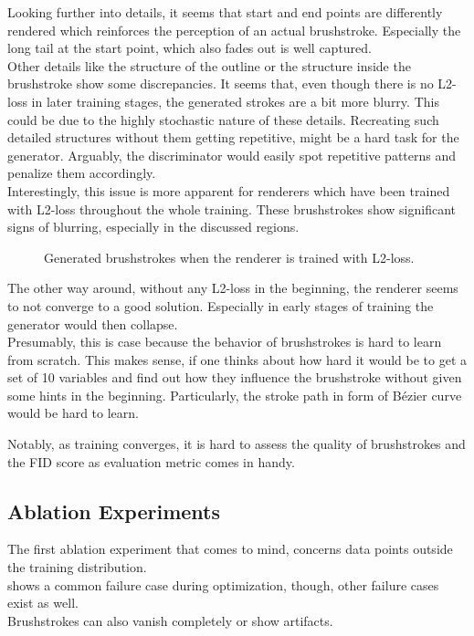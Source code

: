 Looking further into details, it seems that start and end points are differently rendered which reinforces the perception of an actual brushstroke.
Especially the long tail at the start point, which also fades out is well captured.\\
Other details like the structure of the outline or the structure inside the brushstroke show some discrepancies.
It seems that, even though there is no L2-loss in later training stages, the generated strokes are a bit more blurry.
This could be due to the highly stochastic nature of these details.
Recreating such detailed structures without them getting repetitive, might be a hard task for the generator.
Arguably, the discriminator would easily spot repetitive patterns and penalize them accordingly.\\
Interestingly, this issue is more apparent for renderers which have been trained with L2-loss throughout the whole training.
These brushstrokes show significant signs of blurring, especially in the discussed regions.\\
\begin{figure}
    \caption{Generated brushstrokes when the renderer is trained with L2-loss.}
\end{figure}
The other way around, without any L2-loss in the beginning, the renderer seems to not converge to a good solution.
Especially in early stages of training the generator would then collapse.\\
Presumably, this is case because the behavior of brushstrokes is hard to learn from scratch.
This makes sense, if one thinks about how hard it would be to get a set of 10 variables and find out how they influence the brushstroke without given some hints in the beginning.
Particularly, the stroke path in form of Bézier curve would be hard to learn.

Notably, as training converges, it is hard to assess the quality of brushstrokes and the FID score as evaluation metric comes in handy.

\subsection{Ablation Experiments}
The first ablation experiment that comes to mind, concerns data points outside the training distribution.\\
 shows a common failure case during optimization, though, other failure cases exist as well.\\
Brushstrokes can also vanish completely or show artifacts.\\

